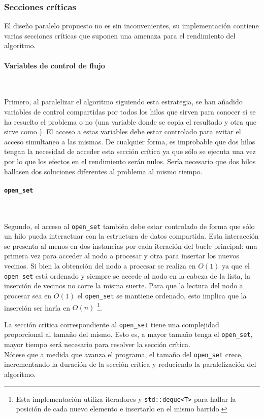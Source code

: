 \subsubsection{Secciones críticas}

El diseño paralelo propuesto no es sin inconvenientes,
su implementación contiene varias secciones críticas que suponen
una amenaza para el rendimiento del algoritmo.

\paragraph{Variables de control de flujo}~

Primero, al paralelizar el algoritmo siguiendo esta estrategia,
se han añadido variables de control compartidas por todos
los hilos que sirven para conocer si se ha resuelto el problema
o no (una variable donde se copia el resultado y
otra que sirve como ).
El acceso a estas variables debe estar controlado
para evitar el acceso simultaneo a las mismas.
De cualquier forma, es improbable que dos hilos tengan
la necesidad de acceder esta sección crítica ya que sólo
se ejecuta una vez por lo que los efectos en el rendimiento serán nulos.
Sería necesario que dos hilos hallasen dos soluciones diferentes al
problema al mismo tiempo.

\paragraph{\lstinline{open_set}}~

Segundo, el acceso al \lstinline{open_set} también 
debe estar controlado de forma que sólo un hilo
pueda interactuar con la estructura de datos compartida.
Esta interacción se presenta al menos en dos instancias por
cada iteración del bucle principal:
una primera vez para acceder al nodo a procesar
y otra para insertar los nuevos vecinos.
Si bien la obtención del nodo a procesar se realiza en $O(1)$
ya que el \lstinline{open_set} está ordenado y
siempre se accede al nodo en la cabeza de la lista,
la inserción de vecinos no corre la misma suerte.
Para que la lectura del nodo a procesar sea en $O(1)$
el \lstinline{open_set} se mantiene ordenado,
esto implica que la inserción ser haría en $O(n)$
\footnote{Esta implementación utiliza iteradores y
\lstinline{std::deque<T>} para hallar la posición de cada
nuevo elemento e insertarlo en el mismo barrido.}.

\begin{notebox}
    La sección crítica correspondiente al \lstinline{open_set}
    tiene una complejidad proporcional al tamaño del mismo.
    Esto es, a mayor tamaño tenga el \lstinline{open_set},
    mayor tiempo será necesario para resolver la sección crítica.\\

    Nótese que a medida que avanza el programa,
    el tamaño del \lstinline{open_set} crece,
    incrementando la duración de la sección crítica y
    reduciendo la paralelización del algoritmo. 
\end{notebox}

